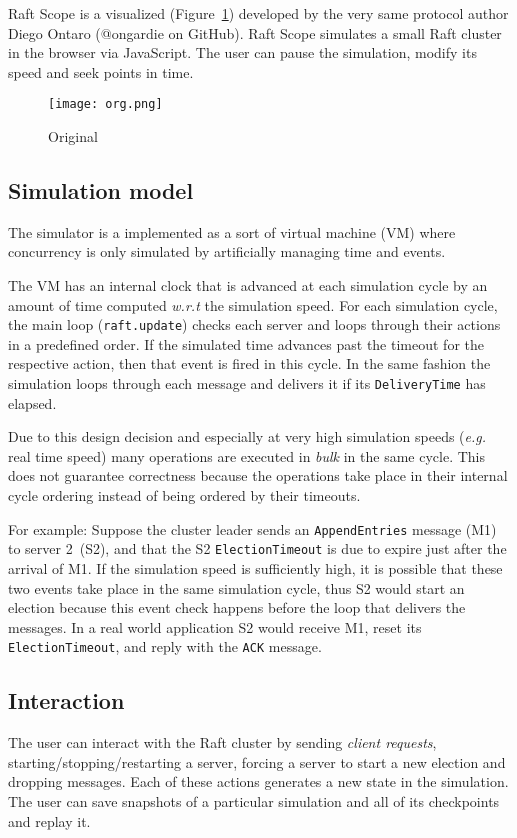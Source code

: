 Raft Scope is a visualized (Figure~\ref{fig:original}) developed by the very same protocol author
Diego Ontaro (@ongardie on GitHub).
Raft Scope simulates a small Raft cluster in the browser via JavaScript.
The user can pause the simulation, modify its speed and seek points in time.

\begin{figure}[h]
    \centering
    \texttt{[image: org.png]}
    \caption{Original}\label{fig:original}
\end{figure}

\subsection{Simulation model}\label{sec:simulation}
The simulator is a implemented as a sort of virtual machine (VM) where
concurrency is only simulated by artificially managing time and events.

The VM has an internal clock that is advanced at each simulation cycle
by an amount of time computed \textit{w.r.t} the simulation speed.
For each simulation cycle, the main loop (\texttt{raft.update}) checks each server and loops through their
actions in a predefined order. If the simulated time advances past the timeout for the respective action, then
that event is fired in this cycle. In the same fashion the simulation loops through each message and delivers it if its
\texttt{DeliveryTime} has elapsed.

Due to this design decision and especially at very high simulation speeds (\textit{e.g.} real time speed)
many operations are executed in \emph{bulk} in the same cycle.
This does not guarantee correctness because the operations take place in their internal cycle ordering instead of
being ordered by their timeouts.

For example:
Suppose the cluster leader sends an \texttt{AppendEntries} message (M1)
to server 2~(S2), and that the S2 \texttt{ElectionTimeout} is due to expire just after
the arrival of M1. If the simulation speed is sufficiently high, it is possible that these two events
take place in the same simulation cycle, thus S2 would start an election because this event check happens before the
loop that delivers the messages.
In a real world application S2 would receive M1, reset its \texttt{ElectionTimeout}, and reply with the \texttt{ACK} message.

\subsection{Interaction}
The user can interact with the Raft cluster by sending \emph{client requests}, starting/stopping/restarting a server,
forcing a server to start a new election and dropping messages.
Each of these actions generates a new state in the simulation.
The user can save snapshots of a particular simulation and all of its checkpoints and replay it.

